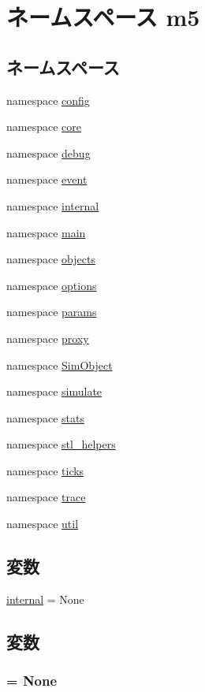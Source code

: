 \hypertarget{namespacem5}{
\section{ネームスペース m5}
\label{namespacem5}
}
\subsection*{ネームスペース}
\begin{DoxyCompactItemize}
\item 
namespace \hyperlink{namespacem5_1_1config}{config}
\item 
namespace \hyperlink{namespacem5_1_1core}{core}
\item 
namespace \hyperlink{namespacem5_1_1debug}{debug}
\item 
namespace \hyperlink{namespacem5_1_1event}{event}
\item 
namespace \hyperlink{namespacem5_1_1internal}{internal}
\item 
namespace \hyperlink{namespacem5_1_1main}{main}
\item 
namespace \hyperlink{namespacem5_1_1objects}{objects}
\item 
namespace \hyperlink{namespacem5_1_1options}{options}
\item 
namespace \hyperlink{namespacem5_1_1params}{params}
\item 
namespace \hyperlink{namespacem5_1_1proxy}{proxy}
\item 
namespace \hyperlink{namespacem5_1_1SimObject}{SimObject}
\item 
namespace \hyperlink{namespacem5_1_1simulate}{simulate}
\item 
namespace \hyperlink{namespacem5_1_1stats}{stats}
\item 
namespace \hyperlink{namespacem5_1_1stl__helpers}{stl\_\-helpers}
\item 
namespace \hyperlink{namespacem5_1_1ticks}{ticks}
\item 
namespace \hyperlink{namespacem5_1_1trace}{trace}
\item 
namespace \hyperlink{namespacem5_1_1util}{util}
\end{DoxyCompactItemize}
\subsection*{変数}
\begin{DoxyCompactItemize}
\item 
\hyperlink{namespacem5_aefeaeef24c55ae50b43b27d4132fbe81}{internal} = None
\end{DoxyCompactItemize}


\subsection{変数}
\hypertarget{namespacem5_aefeaeef24c55ae50b43b27d4132fbe81}{
\subsubsection[{internal}]{ = None}}
\label{namespacem5_aefeaeef24c55ae50b43b27d4132fbe81}

